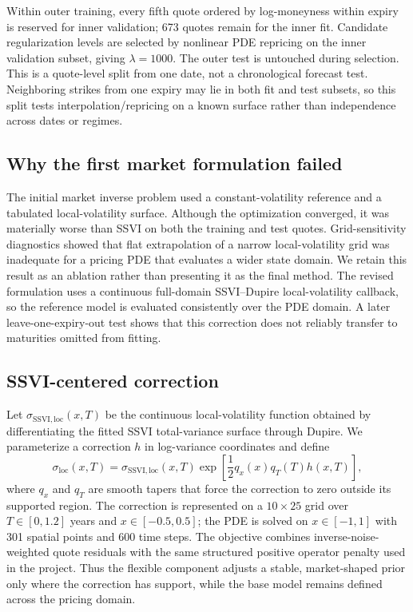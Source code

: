 \documentclass[11pt,a4paper]{article}
\begin{document}
Within outer training, every fifth quote ordered by log-moneyness within expiry is reserved for inner validation; 673 quotes remain for the inner fit. Candidate regularization levels are selected by nonlinear PDE repricing on the inner validation subset, giving $\lambda=1000$. The outer test is untouched during selection. This is a quote-level split from one date, not a chronological forecast test. Neighboring strikes from one expiry may lie in both fit and test subsets, so this split tests interpolation/repricing on a known surface rather than independence across dates or regimes.

\subsection{Why the first market formulation failed}
The initial market inverse problem used a constant-volatility reference and a tabulated local-volatility surface. Although the optimization converged, it was materially worse than SSVI on both the training and test quotes. Grid-sensitivity diagnostics showed that flat extrapolation of a narrow local-volatility grid was inadequate for a pricing PDE that evaluates a wider state domain. We retain this result as an ablation rather than presenting it as the final method. The revised formulation uses a continuous full-domain SSVI--Dupire local-volatility callback, so the reference model is evaluated consistently over the PDE domain. A later leave-one-expiry-out test shows that this correction does not reliably transfer to maturities omitted from fitting.

\subsection{SSVI-centered correction}
Let $\sigma_{\mathrm{SSVI,loc}}(x,T)$ be the continuous local-volatility function obtained by differentiating the fitted SSVI total-variance surface through Dupire. We parameterize a correction $h$ in log-variance coordinates and define
\begin{equation}
\sigma_{\mathrm{loc}}(x,T)=\sigma_{\mathrm{SSVI,loc}}(x,T)\exp\!\left[\frac{1}{2}q_x(x)q_T(T)h(x,T)\right],
\label{eq:ssvi-correction}
\end{equation}
where $q_x$ and $q_T$ are smooth tapers that force the correction to zero outside its supported region. The correction is represented on a $10\times25$ grid over $T\in[0,1.2]$ years and $x\in[-0.5,0.5]$; the PDE is solved on $x\in[-1,1]$ with 301 spatial points and 600 time steps. The objective combines inverse-noise-weighted quote residuals with the same structured positive operator penalty used in the project. Thus the flexible component adjusts a stable, market-shaped prior only where the correction has support, while the base model remains defined across the pricing domain.
\end{document}
